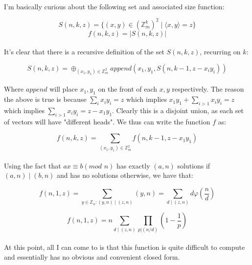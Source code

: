 \documentclass{article}
\begin{document}
\paragraph*{}
  I'm basically curious about the following set and associated size function:

\[S(n, k, z) = \{ (x, y) \in (\mathbb{Z}_m^k)^2 \mid \langle x, y \rangle = z \} \] 
\[f(n, k, z) = |S(n, k, z)| \]

\paragraph*{}
  It's clear that there is a recursive definition of the set $S(n, k, z)$, recurring
  on $k$:

\[ S(n, k, z) = \oplus_{(x_1, y_1) \in \mathbb{Z}_m^2} append(x_1, y_1, S(n, k - 1, z - x_iy_i)) \]

\paragraph*{}
  Where $append$ will place $x_1, y_1$ on the front of each $x, y$ respectively. The reason
  the above is true is because $\sum_i x_i y_i = z$ which implies $x_1 y_1 + \sum_{i>1} x_i y_i = z$
  which implies $\sum_{i>1}x_iy_i = z - x_1y_1$. Clearly this is a disjoint union, as each
  set of vectors will have "different heads". We thus can write the function $f$ as:

\[ f(n, k, z) = \sum_{(x_1, y_1) \in \mathbb{Z}_m^2} f(n, k - 1, z - x_1y_1) \]

\paragraph*{}
  Using the fact that $ax \equiv b (\textit{mod } n)$ has exactly $(a, n)$ solutions if $(a, n) \mid
  (b, n)$ and has no solutions otherwise, we have that:

\[ f(n, 1, z) = \sum_{y \in \mathbb{Z}_n : (y, n) \mid (z, n)} (y, n) = \sum_{d \mid (z, n)} d \varphi(\frac{n}{d}) \]

\[ f(n, 1, z) = n \sum_{d \mid (z, n)} \prod_{p | (n / d)} (1 - \frac{1}{p}) \]

\paragraph*{}
  At this point, all I can come to is that this function is quite difficult to compute and
  essentially has no obvious and convenient closed form.
\end{document}
